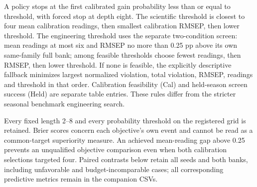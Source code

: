 \documentclass[10pt,a4paper]{article}
\begin{document}
A policy stops at the first calibrated gain probability less than or equal to threshold, with forced stop at depth eight. The scientific threshold is closest to four mean calibration readings, then smallest calibration RMSEP, then lower threshold. The engineering threshold uses the separate two-condition screen: mean readings at most six and RMSEP no more than 0.25 pp above its own same-family full bank; among feasible thresholds choose fewest readings, then RMSEP, then lower threshold. If none is feasible, the explicitly descriptive fallback minimizes largest normalized violation, total violation, RMSEP, readings and threshold in that order. Calibration feasibility (Cal) and held-season screen success (Held) are separate table entries. These rules differ from the stricter seasonal benchmark engineering search.

Every fixed length 2--8 and every probability threshold on the registered grid is retained. Brier scores concern each objective's own event and cannot be read as a common-target superiority measure. An achieved mean-reading gap above 0.25 prevents an unqualified objective comparison even when both calibration selections targeted four. Paired contrasts below retain all seeds and both banks, including unfavorable and budget-incomparable cases; all corresponding predictive metrics remain in the companion CSVs.
\end{document}
